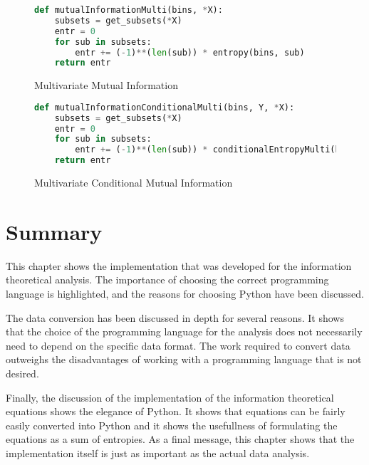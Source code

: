 \begin{figure}[H]
\caption{Multivariate Mutual Information}
\label{impl:mulmutual}
\begin{lstlisting}[language=Python]
def mutualInformationMulti(bins, *X):
    subsets = get_subsets(*X)
    entr = 0
    for sub in subsets:
        entr += (-1)**(len(sub)) * entropy(bins, sub)
    return entr
\end{lstlisting}
\end{figure}

\begin{figure}[H]
\caption{Multivariate Conditional Mutual Information}
\label{impl:mulcondmutual}
\begin{lstlisting}[language=Python]
def mutualInformationConditionalMulti(bins, Y, *X):
    subsets = get_subsets(*X)
    entr = 0
    for sub in subsets:
        entr += (-1)**(len(sub)) * conditionalEntropyMulti(bins, sub, [Y])
    return entr
\end{lstlisting}
\end{figure}

\section{Summary}

This chapter shows the implementation that was developed for the information theoretical analysis. The importance of choosing the correct programming language is highlighted, and the reasons for choosing Python have been discussed. 

The data conversion has been discussed in depth for several reasons. It shows that the choice of the programming language for the analysis does not necessarily need to depend on the specific data format. The work required to convert data outweighs the disadvantages of working with a programming language that is not desired.

Finally, the discussion of the implementation of the information theoretical equations shows the elegance of Python. It shows that equations can be fairly easily converted into Python and it shows the usefullness of formulating the equations as a sum of entropies. As a final message, this chapter shows that the implementation itself is just as important as the actual data analysis.